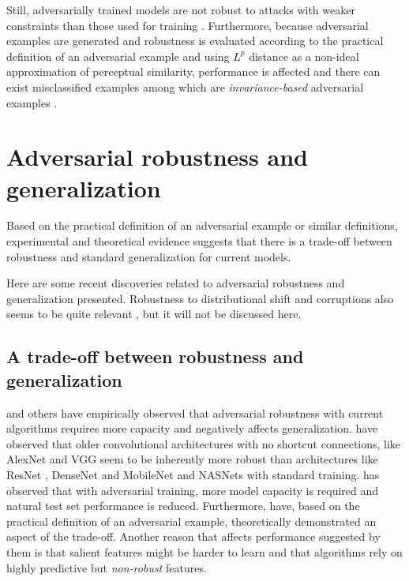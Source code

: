 \documentclass[conference,compsoc]{IEEEtran}
\begin{document}
Still, adversarially trained models are not robust to attacks with weaker constraints than those used for training \citep{Schott:2018:TDFARNNMM}. Furthermore, because adversarial examples are generated and robustness is evaluated according to the practical definition of an adversarial example and using $L^p$ distance as a non-ideal approximation of perceptual similarity, performance is affected \citep{Madry:2017:TDLMRAA,Tsipras:2018:RMBOA} and there can exist misclassified examples among which are \textit{invariance-based} adversarial examples \citep{Jacobsen:2019:EEICNBAR}.



\section{Adversarial robustness and generalization} \label{sec:robustness-generalization}

Based on the practical definition of an adversarial example or similar definitions, experimental \citep{Madry:2017:TDLMRAA,Su:2018:IRTCOACSRDICM} and theoretical evidence \citep{Tsipras:2018:RMBOA} suggests that there is a trade-off between robustness and standard generalization for current models.

Here are some recent discoveries related to adversarial robustness and generalization presented. Robustness to distributional shift and corruptions also seems to be quite relevant \citep{Gilmer:2019:AENCTEN,Hendrycks:2019:BNNRCCP}, but it will not be discussed here.

\subsection{A trade-off between robustness and generalization}

\citet{Madry:2017:TDLMRAA,Su:2017:OPAFDNN,Tsipras:2018:RMBOA} and others have empirically observed that adversarial robustness with current algorithms requires more capacity and negatively affects generalization. \citet{Su:2017:OPAFDNN} have observed that older convolutional architectures with no shortcut connections, like AlexNet \citep{Krizhevsky:2012:ICDCNN} and VGG \citep{Simonyan:2014:VDCNLSIR} seem to be inherently more robust than architectures like ResNet \citep{He:2015:DRLIR}, DenseNet \citep{Huang:2016:DCCN} and MobileNet \citep{Howard:2017:MECNNMVA} and NASNets \citep{Zoph:2018:LTASIR} with standard training. \citet{Madry:2017:TDLMRAA} has observed that with adversarial training, more model capacity is required and natural test set performance is reduced. Furthermore, \citet{Tsipras:2018:RMBOA} have, based on the practical definition of an adversarial example, theoretically demonstrated an aspect of the trade-off. Another reason that affects performance suggested by them is that salient features might be harder to learn and that algorithms rely on highly predictive but \textit{non-robust} features.
\end{document}
